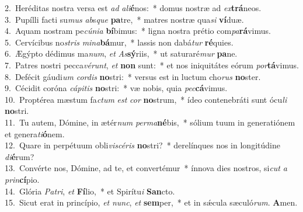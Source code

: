 {2.~}Heréditas nostra versa est \textit{ad} \textit{a}\textit{li}\textbf{é}nos:~* domus nostræ ad \textit{ex}\textbf{trá}neos.\\
{3.~}Pupílli facti su\textit{mus} \textit{ab}s\textit{que} \textbf{pa}tre,~* matres nostræ qua\textit{si} \textbf{ví}duæ.\\
{4.~}Aquam nostram pe\textit{cú}\textit{ni}\textit{a} \textbf{bí}bimus:~* ligna nostra prétio com\textit{pa}\textbf{rá}vimus.\\
{5.~}Cervícibus no\textit{stris} \textit{mi}\textit{na}\textbf{bá}mur,~* lassis non dabá\textit{tur} \textbf{ré}quies.\\
{6.~}Ægýpto dédimus ma\textit{num}, \textit{et} \textit{As}\textbf{sý}riis,~* ut saturaré\textit{mur} \textbf{pa}ne.\\
{7.~}Patres nostri pecca\textit{vé}\textit{runt}, \textit{et} \textbf{non} sunt:~* et nos iniquitátes eórum \textit{por}\textbf{tá}vimus.\\
{8.~}Defécit gáudi\textit{um} \textit{cor}\textit{dis} \textbf{no}stri:~* versus est in luctum cho\textit{rus} \textbf{no}ster.\\
{9.~}Cécidit coróna \textit{cá}\textit{pi}\textit{tis} \textbf{no}stri:~* væ nobis, quia \textit{pec}\textbf{cá}vimus.\\
{10.~}Proptérea mæstum fa\textit{ctum} \textit{est} \textit{cor} \textbf{no}strum,~* ídeo contenebráti sunt ócu\textit{li} \textbf{no}stri.\\
{11.~}Tu autem, Dómine, in ætér\textit{num} \textit{per}\textit{ma}\textbf{né}bis,~* sólium tuum in generatiónem et genera\textit{ti}\textbf{ó}nem.\\
{12.~}Quare in perpétuum obli\textit{vi}\textit{scé}\textit{ris} \textbf{no}stri?~* derelínques nos in longitúdine \textit{di}\textbf{é}rum?\\
{13.~}Convérte nos, Dómine, ad te, et convertémur~* ínnova dies nostros, si\textit{cut} \textit{a} \textit{prin}\textbf{cí}pio.\\
{14.~}Glória \textit{Pa}\textit{tri}, \textit{et} \textbf{Fí}lio,~* et Spirítu\textit{i} \textbf{San}cto.\\
{15.~}Sicut erat in princípio, \textit{et} \textit{nunc}, \textit{et} \textbf{sem}per,~* et in sǽcula sæculó\textit{rum}. \textbf{A}men.\\
